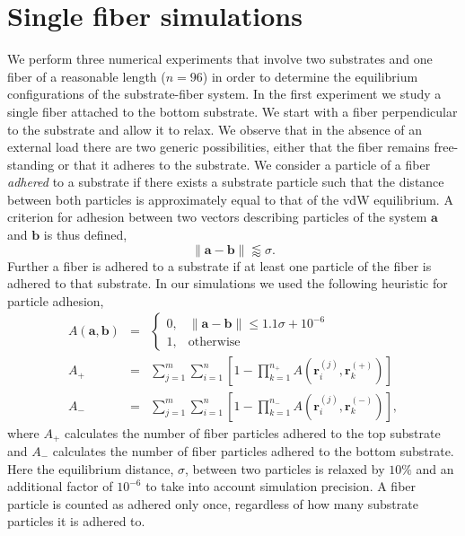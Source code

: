 \chapter{Single fiber simulations} \label{chap:three}

We perform three numerical experiments that involve two substrates and one fiber of a reasonable length ($n=96$) in order to determine the equilibrium configurations of the substrate-fiber system. In the first experiment we study a single fiber attached to the bottom substrate. We start with a fiber perpendicular to the substrate and allow it to relax. We observe that in the absence of an external load there are two generic possibilities, either that the fiber remains free-standing or that it adheres to the substrate. We consider a particle of a fiber \textit{adhered} to a substrate if there exists a substrate particle such that the distance between both particles is approximately equal to that of the vdW equilibrium. A criterion for adhesion between two vectors describing particles of the system $\textbf{a}$ and $\textbf{b}$ is thus defined, 
\begin{equation} \label{eqn:criterion}
	\|\textbf{a} - \textbf{b}\| \lessapprox \sigma.
\end{equation}
Further a fiber is adhered to a substrate if at least one particle of the fiber is adhered to that substrate. In our simulations we used the following heuristic for particle adhesion, 
\begin{eqnarray} \label{eqn:adhesion}
	A(\textbf{a}, \textbf{b}) &=& \left\{ 
		\begin{array}{ll}
			0, & \|\textbf{a} - \textbf{b}\| \leq 1.1 \sigma + 10^{-6}\\
			1, & \mbox{otherwise}
		\end{array}
		\right.  \\
	A_+ &=& \sum_{j=1}^{m} \sum_{i=1}^{n} \left[ 1 - \prod_{k=1}^{n_+} A(\textbf{r}_i^{(j)},\textbf{r}_k^{(+)}) \right] \label{eqn:adhesion:top} \\ 
	A_- &=& \sum_{j=1}^{m} \sum_{i=1}^{n} \left[ 1 - \prod_{k=1}^{n_-} A(\textbf{r}_i^{(j)},\textbf{r}_k^{(-)}) \right], \label{eqn:adhesion:bottom}
\end{eqnarray}
where $A_+$ calculates the number of fiber particles adhered to the top substrate and $A_-$ calculates the number of fiber particles adhered to the bottom substrate.
Here the equilibrium distance, $\sigma$, between two particles is relaxed by $10\%$ and an additional factor of $10^{-6}$ to take into account simulation precision.
A fiber particle is counted as adhered only once, regardless of how many substrate particles it is adhered to.


